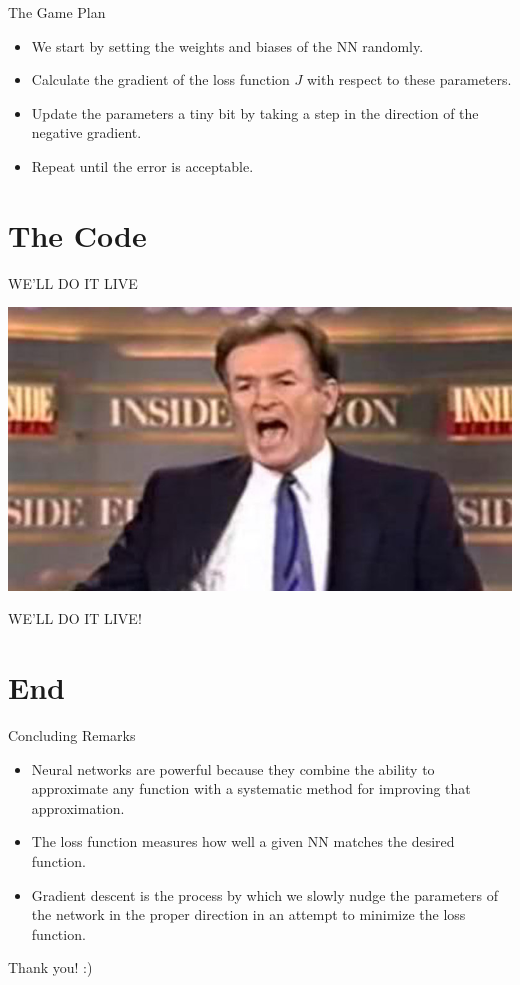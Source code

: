 \documentclass[11pt]{beamer}
\begin{document}
\begin{frame}{The Game Plan}
\begin{itemize}
\item We start by setting the weights and biases of the NN randomly.
\item Calculate the gradient of the loss function $J$ with respect to these parameters.
\item Update the parameters a tiny bit by taking a step in the direction of the negative gradient.
\item Repeat until the error is acceptable.
\end{itemize}
\end{frame}

\section{The Code}

\begin{frame}{WE'LL DO IT LIVE}
\begin{center}
\includegraphics[scale=0.3]{114486a48d800d14f972cb0e74f7b0d9}

WE'LL DO IT LIVE!
\end{center}
\end{frame}

\section{End}

\begin{frame}{Concluding Remarks}

\begin{itemize}
\item Neural networks are powerful because they combine the ability to approximate any function with a systematic method for improving that approximation.
\item The loss function measures how well a given NN matches the desired function.
\item Gradient descent is the process by which we slowly nudge the parameters of the network in the proper direction in an attempt to minimize the loss function.
\end{itemize}

\end{frame}

\begin{frame}
\begin{center}
Thank you! :)
\end{center}
\end{frame}
\end{document}
